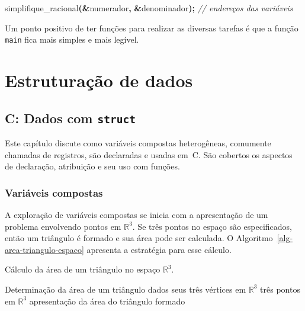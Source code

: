 \documentclass[
  11pt,
  a4paper,
]{scrbook}
\newenvironment{Shaded}{\begin{snugshade}}{\end{snugshade}}
\newcommand{\CommentTok}[1]{\textcolor[rgb]{0.56,0.35,0.01}{\textit{#1}}}
\newcommand{\NormalTok}[1]{#1}
\newcommand{\OperatorTok}[1]{\textcolor[rgb]{0.81,0.36,0.00}{\textbf{#1}}}
\begin{document}
\begin{Shaded}
\begin{Highlighting}[]
\NormalTok{simplifique\_racional}\OperatorTok{(\&}\NormalTok{numerador}\OperatorTok{,} \OperatorTok{\&}\NormalTok{denominador}\OperatorTok{);}  \CommentTok{// endereços das variáveis}
\end{Highlighting}
\end{Shaded}

Um ponto positivo de ter funções para realizar as diversas tarefas é que
a função \texttt{main} fica mais simples e mais legível.

\part{Estruturação de dados}

\chapter{\texorpdfstring{C: Dados com
\texttt{struct}}{C: Dados com struct}}\label{c-dados-com-struct}

Este capítulo discute como variáveis compostas heterogêneas, comumente
chamadas de registros, são declaradas e usadas em~C. São cobertos os
aspectos de declaração, atribuição e seu uso com funções.

\section{Variáveis compostas}\label{variuxe1veis-compostas}

A exploração de variáveis compostas se inicia com a apresentação de um
problema envolvendo pontos em \(\mathbb{R}^3\). Se três pontos no espaço
são especificados, então um triângulo é formado e sua área pode ser
calculada. O Algoritmo~\ref{alg-area-triangulo-espaco} apresenta a
estratégia para esse cálculo.

\begin{algorithm}[H]
\caption{\label{alg-area-triangulo-espaco}Cálculo da área de um
triângulo no espaço \(\mathbb{R}^3\).}
\begingroup%

\begin{algorithmic}
    \Description Determinação da área de um triângulo dados seus três vértices em $\mathbb{R}^3$
    \Require três pontos em $\mathbb{R}^3$
    \Ensure apresentação da área do triângulo formado
    \Statex
\end{algorithmic}

\endgroup
\end{algorithm}
\end{document}
